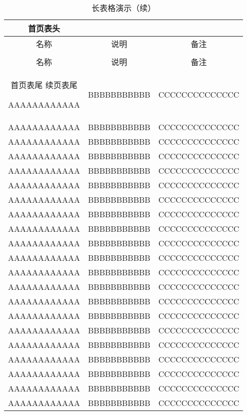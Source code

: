 \begin{longtable}{ccc}
 首页表头
\caption[长表格演示]{长表格演示} \label{tab:longtable} \\
\toprule[1.5pt]
名称  & 说明 & 备注\\
\midrule[1pt]
\endfirsthead
\caption[]{长表格演示（续）} \\
\toprule[1.5pt]
名称  & 说明 & 备注 \\
\midrule[1pt]
\endhead
 首页表尾
\hline
\multicolumn{3}{r}{\small 续下页}
\endfoot
 续页表尾
\bottomrule[1.5pt]
\endlastfoot

AAAAAAAAAAAA   &   BBBBBBBBBBB   &   CCCCCCCCCCCCCC   \\
AAAAAAAAAAAA   &   BBBBBBBBBBB   &   CCCCCCCCCCCCCC   \\
AAAAAAAAAAAA   &   BBBBBBBBBBB   &   CCCCCCCCCCCCCC   \\
AAAAAAAAAAAA   &   BBBBBBBBBBB   &   CCCCCCCCCCCCCC   \\
AAAAAAAAAAAA   &   BBBBBBBBBBB   &   CCCCCCCCCCCCCC   \\
AAAAAAAAAAAA   &   BBBBBBBBBBB   &   CCCCCCCCCCCCCC   \\
AAAAAAAAAAAA   &   BBBBBBBBBBB   &   CCCCCCCCCCCCCC   \\
AAAAAAAAAAAA   &   BBBBBBBBBBB   &   CCCCCCCCCCCCCC   \\
AAAAAAAAAAAA   &   BBBBBBBBBBB   &   CCCCCCCCCCCCCC   \\
AAAAAAAAAAAA   &   BBBBBBBBBBB   &   CCCCCCCCCCCCCC   \\
AAAAAAAAAAAA   &   BBBBBBBBBBB   &   CCCCCCCCCCCCCC   \\
AAAAAAAAAAAA   &   BBBBBBBBBBB   &   CCCCCCCCCCCCCC   \\
AAAAAAAAAAAA   &   BBBBBBBBBBB   &   CCCCCCCCCCCCCC   \\
AAAAAAAAAAAA   &   BBBBBBBBBBB   &   CCCCCCCCCCCCCC   \\
AAAAAAAAAAAA   &   BBBBBBBBBBB   &   CCCCCCCCCCCCCC   \\
AAAAAAAAAAAA   &   BBBBBBBBBBB   &   CCCCCCCCCCCCCC   \\
AAAAAAAAAAAA   &   BBBBBBBBBBB   &   CCCCCCCCCCCCCC   \\
AAAAAAAAAAAA   &   BBBBBBBBBBB   &   CCCCCCCCCCCCCC   \\
AAAAAAAAAAAA   &   BBBBBBBBBBB   &   CCCCCCCCCCCCCC   \\
AAAAAAAAAAAA   &   BBBBBBBBBBB   &   CCCCCCCCCCCCCC   \\
AAAAAAAAAAAA   &   BBBBBBBBBBB   &   CCCCCCCCCCCCCC   \\

\end{longtable}
